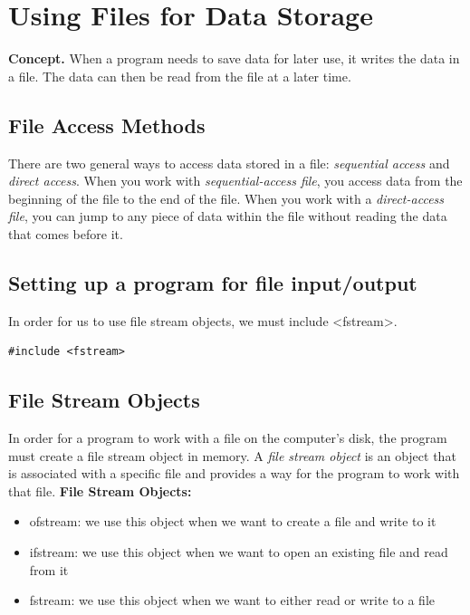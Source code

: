 \documentclass{report}
\begin{document}
    \pagebreak \bigbreak \noindent 
    \section{\LARGE Using Files for Data Storage}
    \bigbreak \noindent 
    \textbf{Concept.} When a program needs to save data for later use, it writes the data in a file. The data can then be read from the file at a later time.
    \bigbreak \noindent 
    \subsection{File Access Methods}
    \bigbreak \noindent 
    There are two general ways to access data stored in a file: \textit{sequential access} and \textit{direct access}. When you work with \textit{sequential-access file}, you access data from the beginning of the file to the end of the file.
    \bigbreak \noindent 
    When you work with a \textit{direct-access file}, you can jump to any piece  of data within the file without reading the data that comes before it.
    \bigbreak \noindent 
    \subsection{Setting up a program for file input/output}
    \bigbreak \noindent 
    In order for us to use file stream objects, we must include <fstream>.
    \bigbreak \noindent 
    \sepline
    \begin{verbatim}
#include <fstream>
    \end{verbatim}
    \sepline
    \bigbreak \noindent 
    \subsection{File Stream Objects}
    \bigbreak \noindent 
    In order for a program to work with a file on the computer's disk, the program must create a file stream object in memory. A \textit{file stream object} is an object that is associated with a specific file and provides a way for the program to work with that file. 
    \bigbreak \noindent 
    \textbf{File Stream Objects:}
    \begin{itemize}
        \item ofstream: we use this object when we want to create a file and write to it
        \item ifstream: we use this object when we want to open an existing file and read from it
        \item fstream: we use this object when we want to either read or write to a file
    \end{itemize}
\end{document}

